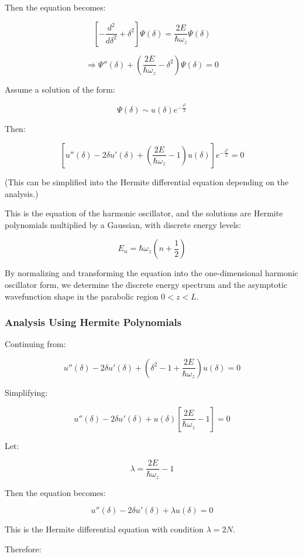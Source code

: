 Then the equation becomes:

\[
\left[ -\frac{d^2}{d\delta^2} + \delta^2 \right] \Psi(\delta) = \frac{2E}{\hbar \omega_z} \Psi(\delta)
\]

\[
\Rightarrow \Psi''(\delta) + \left( \frac{2E}{\hbar \omega_z} - \delta^2 \right) \Psi(\delta) = 0
\]

Assume a solution of the form:

\[
\Psi(\delta) \sim u(\delta) e^{-\frac{\delta^2}{2}}
\]

Then:

\[
\left[ u''(\delta) - 2 \delta u'(\delta) + \left( \frac{2E}{\hbar \omega_z} - 1 \right) u(\delta) \right] e^{-\frac{\delta^2}{2}} = 0
\]

(This can be simplified into the Hermite differential equation depending on the analysis.)

\bigskip

This is the equation of the harmonic oscillator, and the solutions are Hermite polynomials multiplied by a Gaussian, with discrete energy levels:

\[
E_n = \hbar \omega_z \left(n + \frac{1}{2}\right)
\]

By normalizing and transforming the equation into the one-dimensional harmonic oscillator form, we determine the discrete energy spectrum and the asymptotic wavefunction shape in the parabolic region $0 < z < L$.

\subsubsection{Analysis Using Hermite Polynomials}

Continuing from:

\[
u''(\delta) - 2\delta u'(\delta) + \left( \delta^2 - 1 + \frac{2E}{\hbar \omega_z} \right) u(\delta) = 0
\]

Simplifying:

\[
u''(\delta) - 2\delta u'(\delta) + u(\delta) \left[ \frac{2E}{\hbar \omega_z} - 1 \right] = 0
\]

Let:

\[
\lambda = \frac{2E}{\hbar \omega_z} - 1
\]

Then the equation becomes:

\[
u''(\delta) - 2\delta u'(\delta) + \lambda u(\delta) = 0
\]

This is the Hermite differential equation with condition $\lambda = 2N$.

Therefore:

